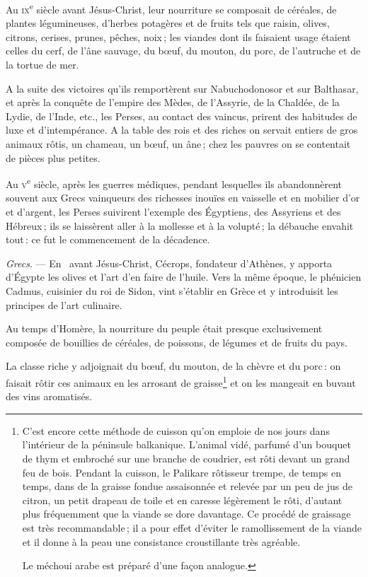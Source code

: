 Au \textsc{ix}\textsuperscript{e} siècle avant Jésus-Christ, leur nourriture se
composait de céréales, de plantes légumineuses, d'herbes potagères et de fruits
tels que raisin, olives, citrons, cerises, prunes, pêches, noix ; les viandes
dont ils faisaient usage étaient celles du cerf, de l'âne sauvage, du bœuf, du
mouton, du porc, de l'autruche et de la tortue de mer.

A la suite des victoires qu'ils remportèrent sur Nabuchodonosor et sur
Balthasar, et après la conquête de l'empire des Mèdes, de l’Assyrie, de la
Chaldée, de la Lydie, de l'Inde, etc., les Perses, au contact des vaincus,
prirent des habitudes de luxe et d'intempérance. A la table des rois et des
riches on servait entiers de gros animaux rôtis, un chameau, un bœuf, un âne ;
chez les pauvres on se contentait de pièces plus petites.

Au \textsc{v}\textsuperscript{e} siècle, après les guerres médiques, pendant
lesquelles ils abandonnèrent souvent aux Grecs vainqueurs des richesses inouïes
en vaisselle et en mobilier d'or et d'argent, les Perses suivirent l'exemple
des Égyptiens, des Assyriens et des Hébreux ; ils se laissèrent aller à la
mollesse et à la volupté ; la débauche envahit tout : ce fut le commencement de
la décadence.

\sk

\textit{Grecs}. — En {\mmm} {\mmm} avant Jésus-Christ, Cécrops,
fondateur d'Athènes, y apporta d'Égypte les olives et l'art d'en faire de
l'huile. Vers la même époque, le phénicien Cadmus, cuisinier du roi de Sidon,
vint s'établir en Grèce et y introduisit les principes de l'art culinaire.

Au temps d'Homère, la nourriture du peuple était presque exclusivement composée
de bouillies de céréales, de poissons, de légumes et de fruits du pays.

La classe riche y adjoignait du bœuf, du mouton, de la chèvre et du porc : on
faisait rôtir ces animaux en les arrosant de graisse\footnote{ C'est encore
cette méthode de cuisson qu'on emploie de nos jours dans l'intérieur de la
péninsule balkanique. L'animal vidé, parfumé d'un bouquet de thym et embroché
sur une branche de coudrier, est rôti devant un grand feu de bois. Pendant la
cuisson, le Palikare rôtisseur trempe, de temps en temps, dans de la graisse
fondue assaisonnée et relevée par un peu de jus de citron, un petit drapeau de
toile et en caresse légèrement le rôti, d'autant plus fréquemment que la viande
se dore davantage. Ce procédé de graissage est très recommandable ; il a pour
effet d'éviter le ramollissement de la viande et il donne à la peau une
consistance croustillante très agréable.

Le méchoui arabe est préparé d'une façon analogue.} et on les mangeait en
buvant des vins aromatisés.

